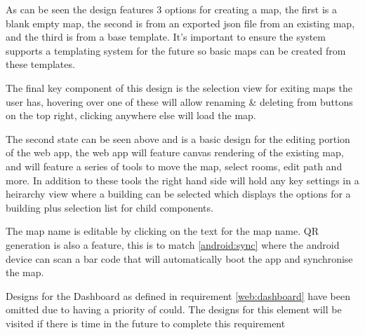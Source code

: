 As can be seen the design features 3 options for creating a map, the first is a blank empty map, the second is from an exported json file from an existing map, and the third is from a base template. It's important to ensure the system supports a templating system for the future so basic maps can be created from these templates.


The final key component of this design is the selection view for exiting maps the user has, hovering over one of these will allow renaming \& deleting from buttons on the top right, clicking anywhere else will load the map.

The second state can be seen above and is a basic design for the editing portion of the web app, the web app will feature canvas rendering of the existing map, and will feature a series of tools to move the map, select rooms, edit path and more. In addition to these tools the right hand side will hold any key settings in a heirarchy view where a building can be selected which displays the options for a building plus selection list for child components. 

The map name is editable by clicking on the text for the map name. QR generation is also a feature, this is to match \ref{android:sync} where the android device can scan a bar code that will automatically boot the app and synchronise the map.

Designs for the Dashboard as defined in requirement \ref{web:dashboard} have been omitted due to having a priority of could. The designs for this element will be visited if there is time in the future to complete this requirement

